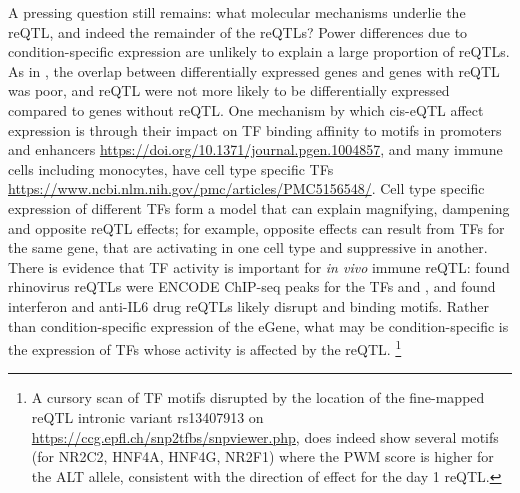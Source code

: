 A pressing question still remains: what molecular mechanisms underlie the  \gls{reQTL}, and indeed the remainder of the \glspl{reQTL}?
Power differences due to condition-specific expression are unlikely to explain a large proportion of reQTLs.
As in \autocite{kim-hellmuth2017GeneticRegulatoryEffects, davenport2018DiscoveringVivoCytokineeQTL}, the overlap between differentially expressed genes and genes with reQTL was poor,
and reQTL were not more likely to be differentially expressed compared to genes without reQTL.
One mechanism by which cis-eQTL affect expression is through their impact on \gls{TF} binding affinity to motifs in promoters and enhancers \url{https://doi.org/10.1371/journal.pgen.1004857},
and many immune cells including monocytes, have cell type specific \glspl{TF} \url{https://www.ncbi.nlm.nih.gov/pmc/articles/PMC5156548/}.
Cell type specific expression of different \glspl{TF} form a model that can explain magnifying, dampening and opposite reQTL effects;
for example, opposite effects can result from \glspl{TF} for the same gene, that are activating in one cell type and suppressive in another\autocite{fu2012UnravelingRegulatoryMechanisms}.
There is evidence that \gls{TF} activity is important for \textit{in vivo} immune reQTL:
\autocite{caliskan2015HostGeneticVariation} found rhinovirus reQTLs were ENCODE ChIP-seq peaks for the \glspl{TF}  and ,
and \autocite{davenport2018DiscoveringVivoCytokineeQTL} found interferon and anti-IL6 drug reQTLs likely disrupt  and  binding motifs.
Rather than condition-specific expression of the eGene, what may be condition-specific is the expression of \glspl{TF} whose activity is affected by the reQTL.
\footnote{
    A cursory scan of \gls{TF} motifs disrupted by the location of the fine-mapped  reQTL intronic variant rs13407913 on \url{https://ccg.epfl.ch/snp2tfbs/snpviewer.php},
    does indeed show several motifs (for NR2C2, HNF4A, HNF4G, NR2F1)
    where the PWM score is higher for the ALT allele, 
    consistent with the direction of effect for the day 1 reQTL.
}


